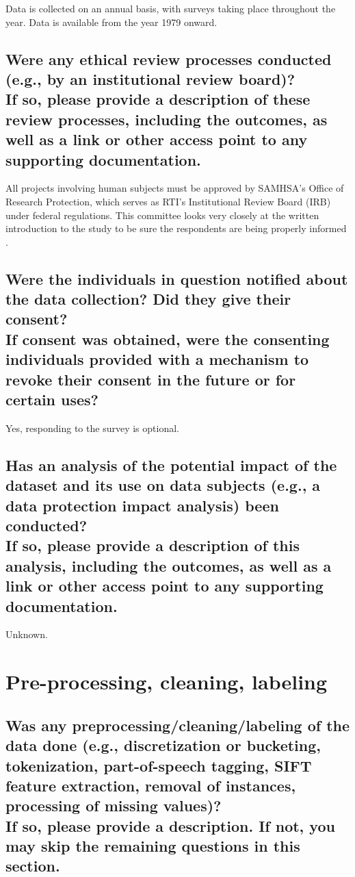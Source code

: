 \documentclass[letterpaper, 10 pt, conference]{ieeeconf}  %
\newcommand{\subtitle}[1]{{\\ \small \normalfont \color{purple} #1}}
\begin{document}
Data is collected on an annual basis, with surveys taking place throughout the year. Data is available from the year 1979 onward. 

\subsection{Were any ethical review processes conducted (e.g., by an institutional review board)? \subtitle{If so, please provide a description of these review processes, including the outcomes, as well as a link or other access point to any supporting documentation.}}

All projects involving human subjects must be approved by SAMHSA's Office of Research Protection, which serves as RTI’s Institutional Review Board (IRB) under federal regulations. This committee looks very closely at the written introduction to the study to be sure the respondents are being properly informed \cite{nsduh_field}.

\subsection{Were the individuals in question notified about the data collection? Did they give their consent? \subtitle{If consent was obtained, were the consenting individuals provided with a mechanism to revoke their consent in the future or for certain uses?}}

Yes, responding to the survey is optional.

\subsection{Has an analysis of the potential impact of the dataset and its use on data subjects (e.g., a data protection impact analysis) been conducted? \subtitle{If so, please provide a description of this analysis, including the outcomes, as well as a link or other access point to any supporting documentation.}}

Unknown. 

\section{Pre-processing, cleaning, labeling}

\subsection{Was any preprocessing/cleaning/labeling of the data done (e.g., discretization or bucketing, tokenization, part-of-speech tagging, SIFT feature extraction, removal of instances, processing of missing values)? \subtitle{If so, please provide a description. If not, you may skip the remaining questions in this section.}}
\end{document}
